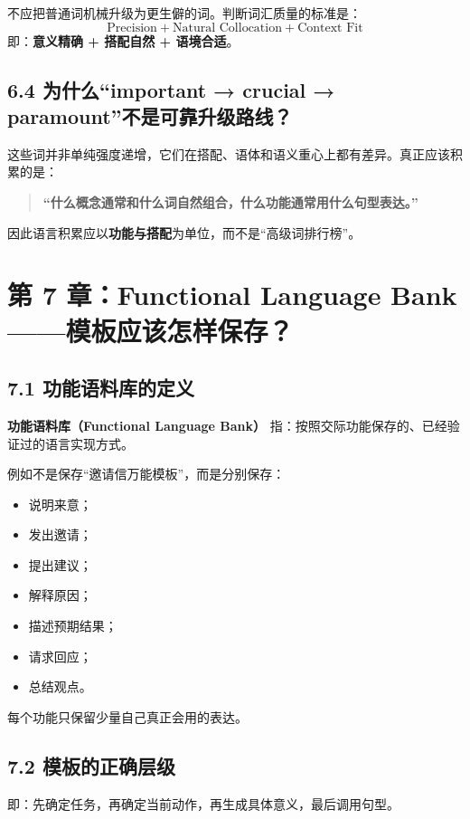 \documentclass[11pt,a4paper]{ctexart}
\newcommand{\kw}[1]{\textbf{#1}}
\newcommand{\term}[2]{\textbf{#1（#2）}}
\begin{document}
不应把普通词机械升级为更生僻的词。判断词汇质量的标准是：
\[
\boxed{
\text{Precision}
+
\text{Natural Collocation}
+
\text{Context Fit}
}
\]
即：\kw{意义精确 + 搭配自然 + 语境合适}。

\subsection{6.4 为什么“important → crucial → paramount”不是可靠升级路线？}
这些词并非单纯强度递增，它们在搭配、语体和语义重心上都有差异。真正应该积累的是：
\begin{quote}
\kw{“什么概念通常和什么词自然组合，什么功能通常用什么句型表达。”}
\end{quote}

因此语言积累应以\kw{功能与搭配}为单位，而不是“高级词排行榜”。

\section{第 7 章：Functional Language Bank——模板应该怎样保存？}

\subsection{7.1 功能语料库的定义}
\term{功能语料库}{Functional Language Bank} 指：按照交际功能保存的、已经验证过的语言实现方式。

例如不是保存“邀请信万能模板”，而是分别保存：
\begin{itemize}
  \item 说明来意；
  \item 发出邀请；
  \item 提出建议；
  \item 解释原因；
  \item 描述预期结果；
  \item 请求回应；
  \item 总结观点。
\end{itemize}

每个功能只保留少量自己真正会用的表达。

\subsection{7.2 模板的正确层级}
\begin{center}
\end{center}
即：先确定任务，再确定当前动作，再生成具体意义，最后调用句型。
\end{document}
